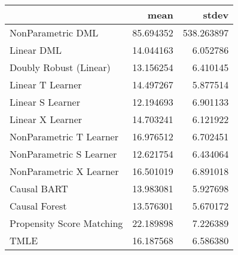 \begin{tabular}{lrr}
\toprule
{} &       mean &       stdev \\
\midrule
NonParametric DML         &  85.694352 &  538.263897 \\
Linear DML                &  14.044163 &    6.052786 \\
Doubly Robust (Linear)    &  13.156254 &    6.410145 \\
Linear T Learner          &  14.497267 &    5.877514 \\
Linear S Learner          &  12.194693 &    6.901133 \\
Linear X Learner          &  14.703241 &    6.121922 \\
NonParametric T Learner   &  16.976512 &    6.702451 \\
NonParametric S Learner   &  12.621754 &    6.434064 \\
NonParametric X Learner   &  16.501019 &    6.891018 \\
Causal BART               &  13.983081 &    5.927698 \\
Causal Forest             &  13.576301 &    5.670172 \\
Propensity Score Matching &  22.189898 &    7.226389 \\
TMLE                      &  16.187568 &    6.586380 \\
\bottomrule
\end{tabular}
